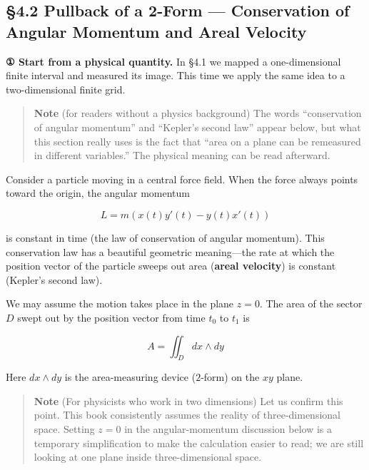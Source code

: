 \documentclass[a4paper,12pt,openany]{book}
\begin{document}
\par\vspace{0.35em}\par

\hypertarget{pullback-of-a-2-form-conservation-of-angular-momentum-and-areal-velocity}{%
\subsection{§4.2 Pullback of a 2-Form — Conservation of Angular
Momentum and Areal
Velocity}\label{pullback-of-a-2-form-conservation-of-angular-momentum-and-areal-velocity}}

\textbf{① Start from a physical quantity.} In §4.1 we mapped a
one-dimensional finite interval and measured its image. This time we
apply the same idea to a two-dimensional finite grid.

\begin{quote}
\textbf{Note} (for readers without a physics background) The words
``conservation of angular momentum'' and ``Kepler's second law'' appear
below, but what this section really uses is the fact that ``area on a
plane can be remeasured in different variables.'' The physical meaning
can be read afterward.
\end{quote}

Consider a particle moving in a central force field. When the force
always points toward the origin, the angular momentum

\[
L
=
m\left(x(t)y'(t)-y(t)x'(t)\right)
\]

is constant in time (the law of conservation of angular momentum). This
conservation law has a beautiful geometric meaning—the rate at which
the position vector of the particle sweeps out area
(\textbf{areal velocity}) is constant (Kepler's second law).

We may assume the motion takes place in the plane \(z=0\). The area of
the sector \(D\) swept out by the position vector from time \(t_0\) to
\(t_1\) is

\[A = \iint_D dx \wedge dy\]

Here \(dx \wedge dy\) is the area-measuring device (\(2\)-form) on the
\(xy\) plane.

\begin{quote}
\textbf{Note} (For physicists who work in two dimensions) Let us confirm
this point. This book consistently assumes the reality of
three-dimensional space. Setting \(z=0\) in the angular-momentum
discussion below is a temporary simplification to make the calculation
easier to read; we are still looking at one plane inside
three-dimensional space.
\end{quote}
\end{document}
